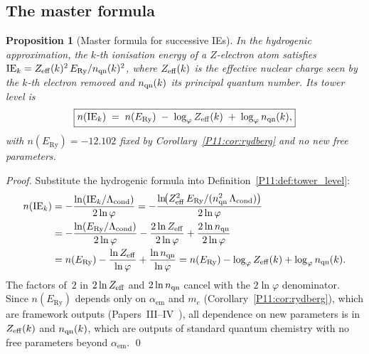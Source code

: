 \documentclass[11pt,a4paper]{article}
\newtheorem{proposition}[theorem]{Proposition}
\theoremstyle{definition}
\theoremstyle{remark}
\newcommand{\vp}{\varphi}
\newcommand{\Lcond}{\Lambda_{\mathrm{cond}}}
\newcommand{\ERy}{E_{\mathrm{Ry}}}
\newcommand{\aem}{\alpha_{\mathrm{em}}}
\newcommand{\nlvl}[1]{n\!\left(#1\right)}
\newcommand{\IE}{\mathrm{IE}}
\begin{document}
\subsection{The master formula}
\label{P11:subsec:master_formula}

\begin{proposition}[Master formula for successive IEs]
\label{P11:prop:master_formula}
In the hydrogenic approximation, the $k$-th ionisation energy of a
$Z$-electron atom satisfies
$\IE_k = Z_{\rm eff}(k)^2\,\ERy/n_{\rm qn}(k)^2$,
where $Z_{\rm eff}(k)$ is the effective nuclear charge seen by the
$k$-th electron removed and $n_{\rm qn}(k)$ its principal quantum
number.  Its tower level is
\begin{equation}
  \boxed{
    \nlvl{\IE_k}
    \;=\; \nlvl{\ERy}
          \;-\; \log_\vp Z_{\rm eff}(k)
          \;+\; \log_\vp n_{\rm qn}(k),
  }
  \label{P11:eq:master_formula}
\end{equation}
with $\nlvl{\ERy}=-12.102$ fixed by Corollary~\ref{P11:cor:rydberg}
and no new free parameters.
\end{proposition}

\begin{proof}
Substitute the hydrogenic formula into
Definition~\ref{P11:def:tower_level}:
\begin{align*}
  \nlvl{\IE_k}
  &= -\frac{\ln(\IE_k/\Lcond)}{2\ln\vp}
  = -\frac{\ln\!\bigl(Z_{\rm eff}^2\,\ERy/(n_{\rm qn}^2\,\Lcond)\bigr)}{2\ln\vp}
  \\
  &= -\frac{\ln(\ERy/\Lcond)}{2\ln\vp}
     -\frac{2\ln Z_{\rm eff}}{2\ln\vp}
     +\frac{2\ln n_{\rm qn}}{2\ln\vp}
  \\
  &= \nlvl{\ERy}
     - \frac{\ln Z_{\rm eff}}{\ln\vp}
     + \frac{\ln n_{\rm qn}}{\ln\vp}
  = \nlvl{\ERy} - \log_\vp Z_{\rm eff}(k) + \log_\vp n_{\rm qn}(k).
\end{align*}
The factors of~$2$ in $2\ln Z_{\rm eff}$ and $2\ln n_{\rm qn}$ cancel
with the $2\ln\vp$ denominator.
Since $\nlvl{\ERy}$ depends only on $\aem$ and $m_e$
(Corollary~\ref{P11:cor:rydberg}), which are framework outputs
(Papers~III--IV~\cite{Paper3,Paper4}), all dependence on new
parameters is in $Z_{\rm eff}(k)$ and $n_{\rm qn}(k)$, which are
outputs of standard quantum chemistry with no free parameters beyond
$\aem$.
\qed
\end{proof}
\end{document}
